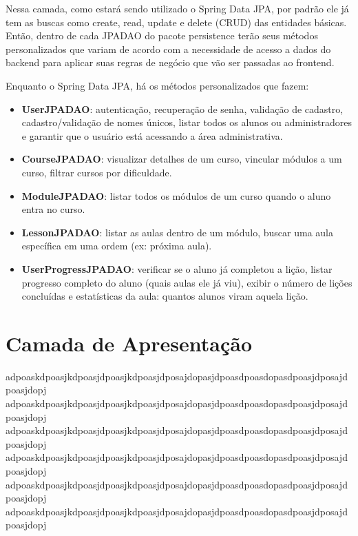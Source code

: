 Nessa camada, como estará sendo utilizado o \textsf{Spring Data JPA}, por padrão ele já tem as buscas como create, read, update e delete (CRUD) das entidades básicas. Então, dentro de cada JPADAO do pacote \textsf{persistence} terão seus métodos personalizados que variam de acordo com a necessidade de acesso a dados do backend para aplicar suas regras de negócio que vão ser passadas ao \textsf{frontend}.

Enquanto o \textsf{Spring Data JPA}, há os métodos personalizados que fazem:

\begin{itemize}
	\item \textbf{UserJPADAO}: autenticação, recuperação de senha, validação de cadastro, cadastro/validação de nomes únicos, listar todos os alunos ou administradores e garantir que o usuário está acessando a área administrativa.
	
	\item \textbf{CourseJPADAO}: visualizar detalhes de um curso, vincular módulos a um curso, filtrar cursos por dificuldade.
	
	\item \textbf{ModuleJPADAO}: listar todos os módulos de um curso quando o aluno entra no curso.
	
	\item \textbf{LessonJPADAO}: listar as aulas dentro de um módulo, buscar uma aula específica em uma ordem (ex: próxima aula).
	
	\item \textbf{UserProgressJPADAO}: verificar se o aluno já completou a lição, listar progresso completo do aluno (quais aulas ele já viu), exibir o número de lições concluídas e estatísticas da aula: quantos alunos viram aquela lição.
\end{itemize}

\section{Camada de Apresentação}
\label{sec-frameweb-apresentacao}


adpoaskdpoasjkdpoasjdpoasjkdpoasjdposajdopasjdpoasdpoasdopasdpoasjdposajdpoasjdopj
adpoaskdpoasjkdpoasjdpoasjkdpoasjdposajdopasjdpoasdpoasdopasdpoasjdposajdpoasjdopj
adpoaskdpoasjkdpoasjdpoasjkdpoasjdposajdopasjdpoasdpoasdopasdpoasjdposajdpoasjdopj
adpoaskdpoasjkdpoasjdpoasjkdpoasjdposajdopasjdpoasdpoasdopasdpoasjdposajdpoasjdopj
adpoaskdpoasjkdpoasjdpoasjkdpoasjdposajdopasjdpoasdpoasdopasdpoasjdposajdpoasjdopj
adpoaskdpoasjkdpoasjdpoasjkdpoasjdposajdopasjdpoasdpoasdopasdpoasjdposajdpoasjdopj
